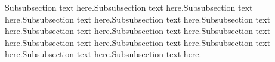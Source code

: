 \documentclass[10pt,journal,cspaper,compsoc]{IEEEtran}
\begin{document}
Subsubsection text here.Subsubsection text here.Subsubsection text here.Subsubsection text here.Subsubsection text here.Subsubsection text here.Subsubsection text here.Subsubsection text here.Subsubsection text here.Subsubsection text here.Subsubsection text here.Subsubsection text here.Subsubsection text here.Subsubsection text here.


%
%



%
%
\end{document}
